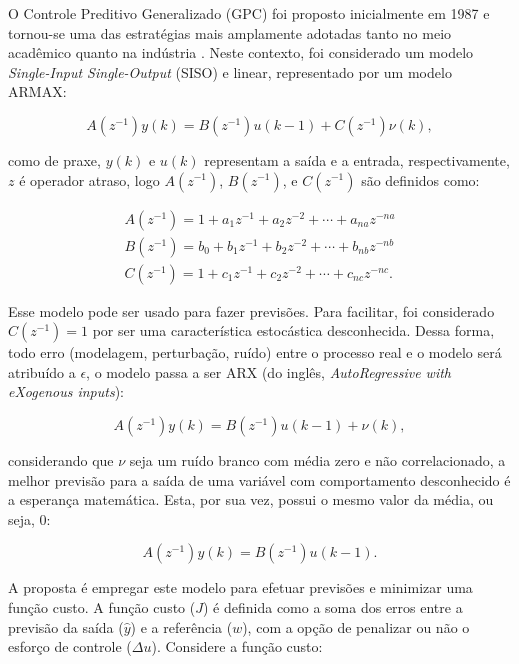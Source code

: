 \documentclass[12pt,           %
a4paper,                       %
openany,                       %
oneside,                       %
chapter=TITLE,                 %
english,                       %
spanish,                       %
brazil,                        %
sumario=tradicional]{abntex2}  %
\begin{document}
\begin{OnehalfSpace}
O Controle Preditivo Generalizado (GPC) foi proposto inicialmente em 1987 \cite{GPC1, GPC2} e tornou-se uma das estratégias mais amplamente adotadas tanto no meio acadêmico quanto na indústria \cite{camacho2004}. Neste contexto, foi considerado um modelo \textit{Single-Input Single-Output} (SISO) e linear, representado por um modelo ARMAX:

\begin{equation}%
     \label{eq:carma}
        A(z^{-1})y(k) = B(z^{-1})u(k-1) + C(z^{-1})\nu (k),
\end{equation}

\noindent como de praxe, $y(k)$ e $u(k)$ representam a saída e a entrada, respectivamente, $z$ é operador atraso, logo $A(z^{-1})$, $B(z^{-1})$, e $C(z^{-1})$ são definidos como:

\begin{equation}
\label{eq:poli}
\begin{split}
    A(z^{-1}) = 1 + a_1 z^{-1} + a_2 z^{-2} + \cdots + a_{na} z^{-na}\\
    B(z^{-1}) = b_0 + b_1 z^{-1} + b_2 z^{-2} + \cdots + b_{nb} z^{-nb}\\
    C(z^{-1}) = 1 + c_1 z^{-1} + c_2 z^{-2} + \cdots + c_{nc} z^{-nc}.
\end{split}
\end{equation} 

Esse modelo pode ser usado para fazer previsões. Para facilitar, foi considerado $C(z^{-1}) = 1$ por ser uma característica estocástica desconhecida. Dessa forma, todo erro (modelagem, perturbação, ruído) entre o processo real e o modelo será atribuído a $\epsilon$, o modelo passa a ser ARX (do inglês, \textit{AutoRegressive with eXogenous inputs}):

\begin{equation} 
     \label{eq:arx}
        A(z^{-1}) y(k) = B(z^{-1}) u(k-1) + \nu (k),
\end{equation}


\noindent considerando que $\nu$ seja um ruído branco com média zero e não correlacionado, a melhor previsão para a saída de uma variável com comportamento desconhecido é a esperança matemática. Esta, por sua vez, possui o mesmo valor da média, ou seja, 0:

\begin{equation}%
     \label{eq:arx0}
        A(z^{-1}) y(k) =  B(z^{-1}) u(k-1).
\end{equation}

A proposta é empregar este modelo  para efetuar previsões e minimizar uma função custo. A função custo ($J$) é definida como a soma dos erros entre a previsão da saída ($\hat{y}$) e a referência ($w$), com a opção de penalizar ou não o esforço de controle ($\Delta u$). Considere a função custo:


\end{OnehalfSpace}
\end{document}
